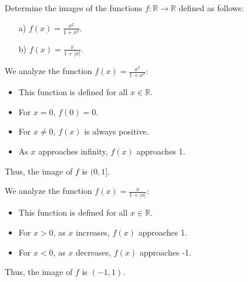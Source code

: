 \begin{exercise}
    Determine the images of the functions \( f: \mathbb{R} \rightarrow \mathbb{R} \) defined as follows:
    \begin{enumerate}
        \item[a)] \( f(x) = \frac{x^2}{1 + x^2} \).
        \item[b)] \( f(x) = \frac{x}{1 + |x|} \).
    \end{enumerate}
\end{exercise}
\begin{solution}
    We analyze the function \( f(x) = \frac{x^2}{1 + x^2} \):
    \begin{itemize}
        \item This function is defined for all \( x \in \mathbb{R} \).
        \item For \( x = 0 \), \( f(0) = 0 \).
        \item For \( x \neq 0 \), \( f(x) \) is always positive.
        \item As \( x \) approaches infinity, \( f(x) \) approaches 1.
    \end{itemize}
    Thus, the image of \( f \) is \( (0, 1] \).
    

    We analyze the function \( f(x) = \frac{x}{1 + |x|} \):
    \begin{itemize}
        \item This function is defined for all \( x \in \mathbb{R} \).
        \item For \( x > 0 \), as \( x \) increases, \( f(x) \) approaches 1.
        \item For \( x < 0 \), as \( x \) decreases, \( f(x) \) approaches -1.
    \end{itemize}
    Thus, the image of \( f \) is \( (-1, 1) \).
    \end{solution}

